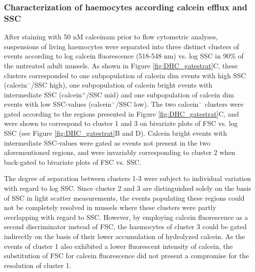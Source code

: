 \subsubsection{Characterization of haemocytes according calcein efflux and SSC}
\label{subsection:calcein_SSC_char}
After staining with 50 nM \acrshort{calceinam} prior to flow cytometric analyses, suspensions of living haemocytes were separated into three distinct clusters of events according to log calcein fluorescence (518-548 nm) vs. log SSC in 90\% of the untreated adult mussels. As shown in Figure \ref{fig:DHC_gatestrat}C, these clusters corresponded to one subpopulation of calcein dim events with high SSC (calcein$^{-}$/SSC high), one subpopulation of calcein bright events with intermediate SSC (calcein$^{+}$/SSC mid) and one subpopulation of calcein dim events with low SSC-values (calcein$^{-}$/SSC low). The two calcein$^{-}$ clusters were gated according to the regions presented in Figure \ref{fig:DHC_gatestrat}C, and were shown to correspond to cluster 1 and 3 on bivariate plots of FSC vs. log SSC (see Figure \ref{fig:DHC_gatestrat}B and D). Calcein bright events with intermediate SSC-values were gated as events not present in the two aforementioned regions, and were invariably corresponding to cluster 2 when back-gated to bivariate plots of FSC vs. SSC.

The degree of separation between clusters 1-3 were subject to individual variation with regard to log SSC. Since cluster 2 and 3 are distinguished solely on the basis of SSC in light scatter measurements, the events populating these regions could not be completely resolved in mussels where these clusters were partly overlapping with regard to SSC. However, by employing calcein fluorescence as a second discriminator instead of FSC, the haemocytes of cluster 3 could be gated indirectly on the basis of their lower accumulation of hydrolyzed calcein. As the events of cluster 1 also exhibited a lower fluorescent intensity of calcein, the substitution of FSC for calcein fluorescence did not present a compromise for the resolution of cluster 1.

